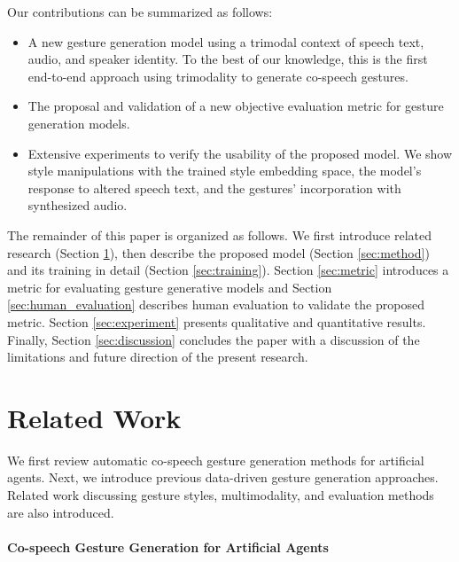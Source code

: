 \documentclass[acmtog]{acmart}
\begin{document}
Our contributions can be summarized as follows:
\begin{itemize}
  \item A new gesture generation model using a trimodal context of speech text, audio, and speaker identity. To the best of our knowledge, this is the first end-to-end approach using trimodality to generate co-speech gestures.
  \item The proposal and validation of a new objective evaluation metric for gesture generation models.
  \item Extensive experiments to verify the usability of the proposed model. We show style manipulations with the trained style embedding space, the model’s response to altered speech text, and the gestures’ incorporation with synthesized audio.
\end{itemize}

The remainder of this paper is organized as follows. We first introduce related research (Section \ref{sec:relatedworks}), then describe the proposed model (Section \ref{sec:method}) and its training in detail (Section \ref{sec:training}). Section \ref{sec:metric} introduces a metric for evaluating gesture generative models and Section \ref{sec:human_evaluation} describes human evaluation to validate the proposed metric. Section \ref{sec:experiment} presents qualitative and quantitative results. Finally, Section \ref{sec:discussion} concludes the paper with a discussion of the limitations and future direction of the present research.
 \section{Related Work} \label{sec:relatedworks}

We first review automatic co-speech gesture generation methods for artificial agents. Next, we introduce previous data-driven gesture generation approaches. Related work discussing gesture styles, multimodality, and evaluation methods are also introduced.

\paragraph{Co-speech Gesture Generation for Artificial Agents}
\end{document}
